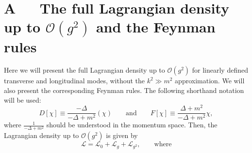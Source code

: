 \documentclass{article}
\begin{document}
\section*{\textbf{A} $\quad$ The full Lagrangian density up to $\mathcal{O}\left(g^2\right)$ and the Feynman rules}\label{section:A}
Here we will present the full Lagrangian density up to $\mathcal{O}\left(g^2\right)$ for linearly defined transverse and longitudinal modes, without the $k^2\gg m^2$ approximation. We will also present the corresponding Feynman rules. The following shorthand notation will be used:
\begin{equation}
    D[\chi]\equiv\frac{-\Delta}{-\Delta+m^2}\left(\chi\right)\quad\quad\text{and}\quad\quad F[\chi]\equiv\frac{\Delta+m^2}{-\Delta+m^2}\chi,
\end{equation}
where  $\frac{1}{-\Delta+m^2}$ should be understood in the momentum space. Then, the Lagrangian density up to $\mathcal{O}(g^2)$ is given by
\begin{equation}
    \mathcal{L}= \mathcal{L}_0+ \mathcal{L}_{g}+ \mathcal{L}_{g^2},\qquad \text{where}
\end{equation}
\end{document}
